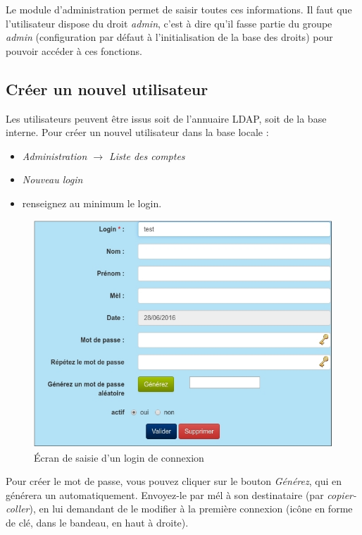 Le module d'administration permet de saisir toutes ces informations. Il faut que l'utilisateur dispose du droit \textit{admin}, c'est à dire qu'il fasse partie du groupe \textit{admin} (configuration par défaut à l'initialisation de la base des droits) pour pouvoir accéder à ces fonctions.

\subsection{Créer un nouvel utilisateur}

Les utilisateurs peuvent être issus soit de l'annuaire LDAP, soit de la base interne. 
Pour créer un nouvel utilisateur dans la base locale :
\begin{itemize}
\item \textit{Administration $\rightarrow$ Liste des comptes }
\item \textit{Nouveau login}
\item renseignez au minimum le login.
\end{itemize}

\begin{figure}[H]
\includegraphics[width=\linewidth]{images/user_create}
\caption{Écran de saisie d'un login de connexion}
\end{figure}

Pour créer le mot de passe, vous pouvez cliquer sur le bouton \textit{Générez}, qui  en générera un automatiquement. Envoyez-le par mél à son destinataire (par \textit{copier-coller}), en lui demandant de le modifier à la première connexion (icône en forme de clé, dans le bandeau, en haut à droite).

